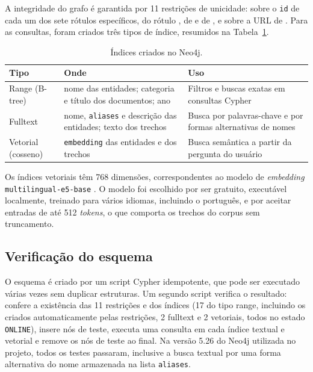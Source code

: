 A integridade do grafo é garantida por 11 restrições de unicidade: sobre o \texttt{id} de cada um dos sete rótulos específicos, do rótulo , de  e de , e sobre a URL de . Para as consultas, foram criados três tipos de índice, resumidos na Tabela~\ref{tab:indices}.

\begin{table}[ht]
\centering
\caption{Índices criados no Neo4j.}
\label{tab:indices}
\small
\begin{tabularx}{\textwidth}{lXX}
\toprule
\textbf{Tipo} & \textbf{Onde} & \textbf{Uso} \\
\midrule
Range (B-tree) & nome das entidades; categoria e título dos documentos; ano & Filtros e buscas exatas em consultas Cypher \\
Fulltext & nome, \texttt{aliases} e descrição das entidades; texto dos trechos & Busca por palavras-chave e por formas alternativas de nomes \\
Vetorial (cosseno) & \texttt{embedding} das entidades e dos trechos & Busca semântica a partir da pergunta do usuário \\
\bottomrule
\end{tabularx}
\end{table}

Os índices vetoriais têm 768 dimensões, correspondentes ao modelo de \emph{embedding} \texttt{multilingual-e5-base} \cite{wang2024me5}. O modelo foi escolhido por ser gratuito, executável localmente, treinado para vários idiomas, incluindo o português, e por aceitar entradas de até 512 \emph{tokens}, o que comporta os trechos do corpus sem truncamento.

\subsection{Verificação do esquema}

O esquema é criado por um script Cypher idempotente, que pode ser executado várias vezes sem duplicar estruturas. Um segundo script verifica o resultado: confere a existência das 11 restrições e dos índices (17 do tipo range, incluindo os criados automaticamente pelas restrições, 2 fulltext e 2 vetoriais, todos no estado \texttt{ONLINE}), insere nós de teste, executa uma consulta em cada índice textual e vetorial e remove os nós de teste ao final. Na versão 5.26 do Neo4j utilizada no projeto, todos os testes passaram, inclusive a busca textual por uma forma alternativa do nome armazenada na lista \texttt{aliases}.
